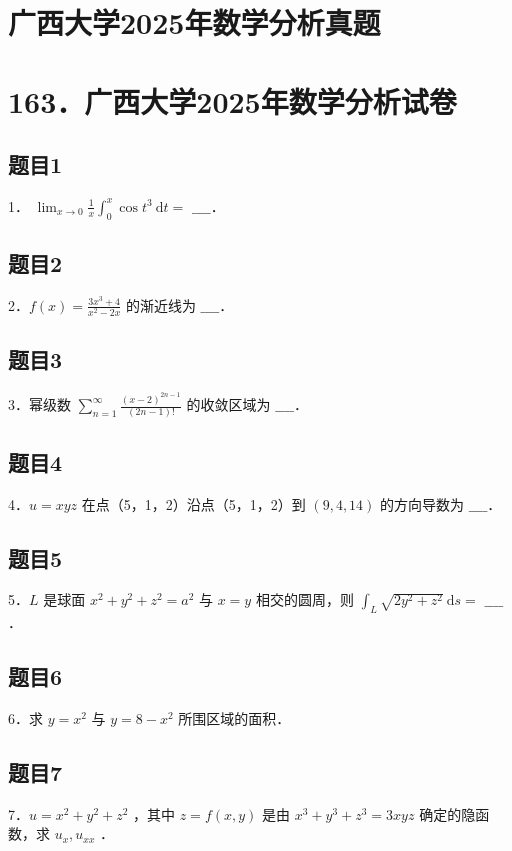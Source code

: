 \documentclass{article}
\begin{document}
\section*{广西大学2025年数学分析真题}
\section*{163．广西大学2025年数学分析试卷}

\subsection{题目1}
1． \(\lim _{x \rightarrow 0} \frac{1}{x} \int_{0}^{x} \cos t^{3} \mathrm{~d} t=\) \(\_\_\_\_\)．

\subsection{题目2}
2．\(f(x)=\frac{3 x^{3}+4}{x^{2}-2 x}\) 的渐近线为 \(\_\_\_\_\)．

\subsection{题目3}
3．幂级数 \(\sum_{n=1}^{\infty} \frac{(x-2)^{2 n-1}}{(2 n-1)!}\) 的收敛区域为 \(\_\_\_\_\)．

\subsection{题目4}
4．\(u=x y z\) 在点（5，1，2）沿点（5，1，2）到 \((9,4,14)\) 的方向导数为 \(\_\_\_\_\)．

\subsection{题目5}
5．\(L\) 是球面 \(x^{2}+y^{2}+z^{2}=a^{2}\) 与 \(x=y\) 相交的圆周，则 \(\int_{L} \sqrt{2 y^{2}+z^{2}} \mathrm{~d} s=\) \(\_\_\_\_\)．

\subsection{题目6}
6．求 \(y=x^{2}\) 与 \(y=8-x^{2}\) 所围区域的面积．

\subsection{题目7}
7．\(u=x^{2}+y^{2}+z^{2}\) ，其中 \(z=f(x, y)\) 是由 \(x^{3}+y^{3}+z^{3}=3 x y z\) 确定的隐函数，求 \(u_{x}, u_{x x}\) ．
\end{document}
